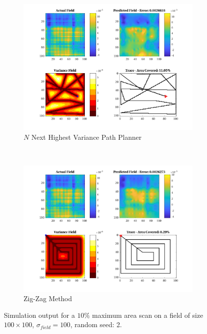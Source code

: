 \begin{figure}[htb!]
\begin{subfigure}[t]{0.5\textwidth}
    \end{subfigure}%
    \\
    \begin{subfigure}[t]{0.5\textwidth}
        \centering
        \includegraphics[width=\linewidth]{figures/hbresults/nnhv_10p_100x100_sf_100_seed_2.png}
        \captionsetup{skip=0.10\baselineskip,size=footnotesize}
        \caption{$N$ Next Highest Variance Path Planner}
    \end{subfigure}%
    ~
    \begin{subfigure}[t]{0.5\textwidth}
        \centering
        \includegraphics[width=\linewidth]{figures/hbresults/zz_10p_100x100_sf_100_seed_2.png}
        \captionsetup{skip=0.10\baselineskip,size=footnotesize}
        \caption{Zig-Zag Method}
    \end{subfigure}%
    \captionsetup{skip=0.20\baselineskip}
    \caption{Simulation output for a $10\%$ maximum area scan on a field of size $100 \times 100$, $\sigma_{field} = 100$, random seed: 2.}
    \label{fig:sim_sigma100_p10_s2}
\end{figure}

